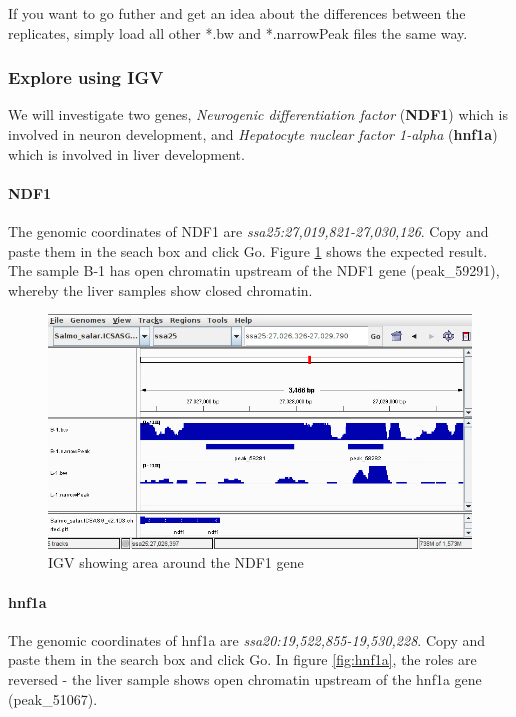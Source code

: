\documentclass[12pt]{article}
\begin{document}
		If you want to go futher and  get an idea about the differences between the replicates, simply load all other *.bw and *.narrowPeak files the same way.
		
		\subsubsection{Explore using IGV}
			We will investigate two genes, \textit{Neurogenic differentiation factor} (\textbf{NDF1}) which is involved in neuron development, and \textit{Hepatocyte nuclear factor 1-alpha} (\textbf{hnf1a}) which is involved in liver development. 
			
			\paragraph{NDF1}
			The genomic coordinates of NDF1 are  \textit{ssa25:27,019,821-27,030,126}. Copy and paste them in the seach box and click Go. 
			Figure \ref{fig:ndf1} shows the expected result. 
			The sample B-1 has open chromatin upstream of the NDF1 gene (peak\_59291), whereby the liver samples show closed chromatin.   
			
			\begin{figure}[H]
				\includegraphics[width=\textwidth]{ndf1.png}
				\caption{IGV showing area around the NDF1 gene}
				\label{fig:ndf1}	
			\end{figure}
			
			\paragraph{hnf1a}
			The genomic coordinates of hnf1a are  \textit{ssa20:19,522,855-19,530,228}. 
			Copy and paste them in the search box and click Go. 
			In figure \ref{fig:hnf1a}, the roles are reversed - the liver sample shows open chromatin upstream of the hnf1a gene (peak\_51067).
		
\end{document}
